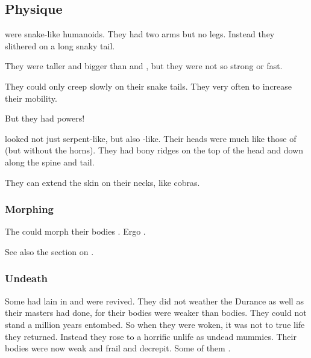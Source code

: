 \subsection{Physique}
\Ophidians were snake-like humanoids. 
They had two arms but no legs. 
Instead they slithered on a long snaky tail. 

They were taller and bigger than \humans{} and \scathae, but they were not so strong or fast. 

They could only creep slowly on their snake tails. 
They very often  to increase their mobility. 

But they had  powers! 

\Ophidians looked not just serpent-like, but also \dragon-like. 
Their heads were much like those of \dragons (but without the horns). 
They had bony ridges on the top of the head and down along the spine and tail. 

They can extend the skin on their necks, like cobras. 





\subsubsection{Morphing}
The \quiljaaran could morph their bodies . 
Ergo . 

See also the section on . 





\subsubsection{Undeath}
Some \ophidians had lain in  and were revived.
They did not weather the Durance as well as their \draconian masters had done, for their \ophidian bodies were weaker than \draconian bodies.
They could not stand a million years entombed. 
So when they were woken, it was not to true life they returned.
Instead they rose to a horrific unlife as undead mummies. 
Their bodies were now weak and frail and decrepit. 
Some of them .









